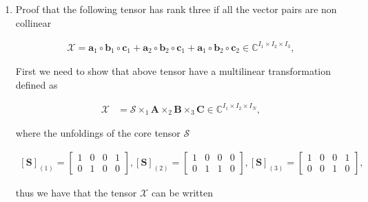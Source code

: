 \documentclass[a4paper,10pt]{article}
\begin{document}
\begin{enumerate}
    \item Proof that the following tensor has rank three if all the vector pairs are non collinear
    
        \begin{align}
            \mathcal{X} = \boldsymbol{a}_{1} \circ \boldsymbol{b}_{1} \circ \boldsymbol{c}_{1} + \boldsymbol{a}_{2} \circ \boldsymbol{b}_{2} \circ \boldsymbol{c}_{1} + \boldsymbol{a}_{1} \circ \boldsymbol{b}_{2} \circ \boldsymbol{c}_{2} \in \mathbb{C}^{I_{1} \times I_{2} \times I_{3}},
        \end{align}

        First we need to show that above tensor have a multilinear transformation defined as 
            
        \begin{align}
            \mathcal{X} &= \mathcal{S} \times_{1} \boldsymbol{A} \times_{2} \boldsymbol{B} \times_{3} \boldsymbol{C} \in \mathbb{C}^{I_{1} \times I_{2} \times I_{N}},  
        \end{align}

        where the unfoldings of the core tensor $\mathcal{S}$

        \begin{align}
            \left[\boldsymbol{S}\right]_{(1)} = 
            \begin{bmatrix}
                1 & 0 & 0 & 1 \\
                0 & 1 & 0 & 0
            \end{bmatrix},  
            \left[\boldsymbol{S}\right]_{(2)} = 
            \begin{bmatrix}
                1 & 0 & 0 & 0 \\
                0 & 1 & 1 & 0
            \end{bmatrix},  
            \left[\boldsymbol{S}\right]_{(3)} = 
            \begin{bmatrix}
                1 & 0 & 0 & 1 \\
                0 & 0 & 1 & 0
            \end{bmatrix},  
        \end{align}

        thus we have that the tensor $\mathcal{X}$ can be written 


\end{enumerate}
\end{document}
